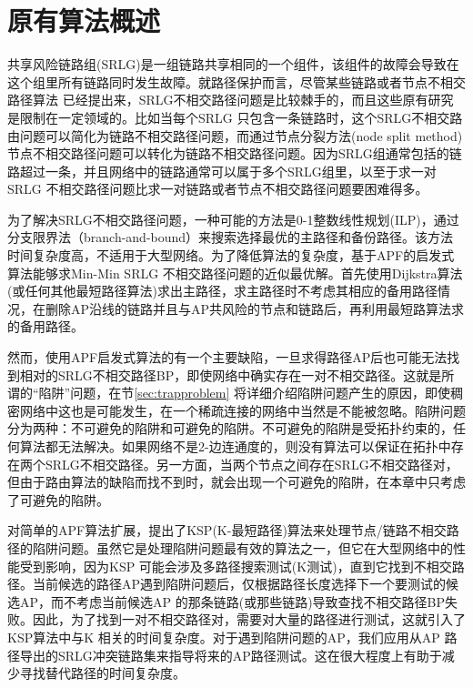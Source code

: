 \section{原有算法概述}
共享风险链路组(SRLG)是一组链路共享相同的一个组件，该组件的故障会导致在这个组里所有链路同时发生故障。就路径保护而言，尽管某些链路或者节点不相交路径算法\cite{li1990complexity,guo2003link,xu2004finding,beshir2011variants,hu2003diverse} 已经提出来，SRLG不相交路径问题是比较棘手的，而且这些原有研究是限制在一定领域的。比如当每个SRLG 只包含一条链路时，这个SRLG不相交路由问题可以简化为链路不相交路径问题，而通过节点分裂方法(node split method)\cite{ford2015flows}节点不相交路径问题可以转化为链路不相交路径问题。因为SRLG组通常包括的链路超过一条，并且网络中的链路通常可以属于多个SRLG组里，以至于求一对SRLG 不相交路径问题比求一对链路或者节点不相交路径问题要困难得多。

为了解决SRLG不相交路径问题，一种可能的方法是0-1整数线性规划(ILP)\cite{hu2003diverse}，通过分支限界法（branch-and-bound）来搜索选择最优的主路径和备份路径。该方法时间复杂度高，不适用于大型网络。为了降低算法的复杂度，基于APF的启发式算法\cite{oki2002disjoint,li2002fiber,eppstein1998finding}能够求Min-Min SRLG 不相交路径问题的近似最优解。首先使用Dijkstra算法(或任何其他最短路径算法)求出主路径，求主路径时不考虑其相应的备用路径情况，在删除AP沿线的链路并且与AP共风险的节点和链路后，再利用最短路算法求的备用路径。

然而，使用APF启发式算法的有一个主要缺陷，一旦求得路径AP后也可能无法找到相对的SRLG不相交路径BP，即使网络中确实存在一对不相交路径。这就是所谓的“陷阱”问题，在节\ref{sec:trapproblem} 将详细介绍陷阱问题产生的原因，即使稠密网络中\cite{laborczi2001solving}这也是可能发生，在一个稀疏连接的网络中当然是不能被忽略。陷阱问题分为两种：不可避免的陷阱和可避免的陷阱。不可避免的陷阱是受拓扑约束的，任何算法都无法解决。如果网络不是2-边连通度的，则没有算法可以保证在拓扑中存在两个SRLG不相交路径。另一方面，当两个节点之间存在SRLG不相交路径对，但由于路由算法的缺陷而找不到时，就会出现一个可避免的陷阱，在本章中只考虑了可避免的陷阱。

对简单的APF算法扩展，提出了KSP(K-最短路径)算法来处理节点/链路不相交路径的陷阱问题。虽然它是处理陷阱问题最有效的算法之一，但它在大型网络中的性能受到影响，因为KSP 可能会涉及多路径搜索测试(K测试)，直到它找到不相交路径。当前候选的路径AP遇到陷阱问题后，仅根据路径长度选择下一个要测试的候选AP，而不考虑当前候选AP 的那条链路(或那些链路)导致查找不相交路径BP失败。因此，为了找到一对不相交路径对，需要对大量的路径进行测试，这就引入了KSP算法中与K 相关的时间复杂度。对于遇到陷阱问题的AP，我们应用从AP 路径导出的SRLG冲突链路集来指导将来的AP路径测试。这在很大程度上有助于减少寻找替代路径的时间复杂度。

